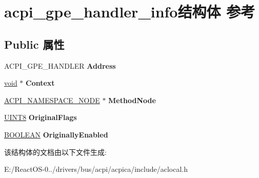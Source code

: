 \hypertarget{structacpi__gpe__handler__info}{}\section{acpi\+\_\+gpe\+\_\+handler\+\_\+info结构体 参考}
\label{structacpi__gpe__handler__info}
\subsection*{Public 属性}
\begin{DoxyCompactItemize}
\item 
\mbox{\label{structacpi__gpe__handler__info_ae01e370fb6df9847e21057d34720e4e7}} 
A\+C\+P\+I\+\_\+\+G\+P\+E\+\_\+\+H\+A\+N\+D\+L\+ER {\bfseries Address}
\item 
\mbox{\label{structacpi__gpe__handler__info_a1840bbaaddfbe1a5d7b0b4d96075db66}} 
\hyperlink{interfacevoid}{void} $\ast$ {\bfseries Context}
\item 
\mbox{\label{structacpi__gpe__handler__info_a4f09683af4cba006337d096b00a5a97e}} 
\hyperlink{structacpi__namespace__node}{A\+C\+P\+I\+\_\+\+N\+A\+M\+E\+S\+P\+A\+C\+E\+\_\+\+N\+O\+DE} $\ast$ {\bfseries Method\+Node}
\item 
\mbox{\label{structacpi__gpe__handler__info_aaefc7321618204893e0c1debac528c4e}} 
\hyperlink{_processor_bind_8h_ab27e9918b538ce9d8ca692479b375b6a}{U\+I\+N\+T8} {\bfseries Original\+Flags}
\item 
\mbox{\label{structacpi__gpe__handler__info_acf1b1ffb8e0e4a10f4a7c3c8171611e0}} 
\hyperlink{_processor_bind_8h_a112e3146cb38b6ee95e64d85842e380a}{B\+O\+O\+L\+E\+AN} {\bfseries Originally\+Enabled}
\end{DoxyCompactItemize}


该结构体的文档由以下文件生成\+:\begin{DoxyCompactItemize}
\item 
E\+:/\+React\+O\+S-\/0../drivers/bus/acpi/acpica/include/aclocal.\+h\end{DoxyCompactItemize}
